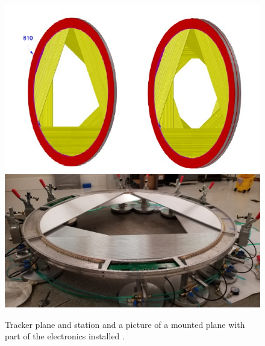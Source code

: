 \documentclass[12pt,a4paper,openright, oneside, titlepage]{book} %
\begin{document}
\begin{figure}[h!]
\centering
\includegraphics[scale=0.3]{Tracker_plane}
\includegraphics[scale=0.35]{Tracker_plane_picture}
\caption[Face and Plane of the tracker]{Tracker plane and station \cite{MTDR} and a picture of a mounted plane with part of the electronics installed \cite{Manolis}.}
\label{_Tracker_plane}
\end{figure}
\end{document}
